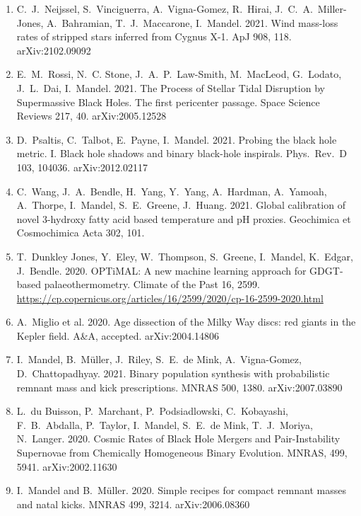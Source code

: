 \documentclass[margin,line]{res}
\begin{document}
\begin{resume}
\begin{enumerate}
\item C.~J.~Neijssel, S.~Vinciguerra, A.~Vigna-Gomez, R.~Hirai, J.~C.~A.~Miller-Jones, A.~Bahramian, T.~J.~Maccarone, I.~Mandel.  2021.  Wind mass-loss rates of stripped stars inferred from Cygnus X-1. ApJ 908, 118.  arXiv:2102.09092

\item E.~M.~Rossi, N.~C. Stone, J.~A.~P.~Law-Smith, M.~MacLeod, G.~Lodato, J.~L.~Dai, I.~Mandel.  2021.  The Process of Stellar Tidal Disruption by Supermassive Black Holes. The first pericenter passage.  Space Science Reviews 217, 40.  arXiv:2005.12528

\item D.~Psaltis, C.~Talbot, E.~Payne, I.~Mandel.  2021. Probing the black hole metric. I. Black hole shadows and binary black-hole inspirals.  Phys.~Rev.~D 103, 104036. arXiv:2012.02117

\item C.~Wang, J.~A.~Bendle,  H.~Yang, Y.~Yang, A.~Hardman, A.~Yamoah, A.~Thorpe, I.~Mandel, S.~E.~Greene, J.~Huang.  2021. Global calibration of novel 3-hydroxy fatty acid based temperature and pH proxies.  Geochimica et Cosmochimica Acta 302, 101. 

\item T.~Dunkley Jones, Y.~Eley, W.~Thompson, S.~Greene, I.~Mandel, K.~Edgar, J.~Bendle.  2020.  OPTiMAL: A new machine learning approach for GDGT-based palaeothermometry.  Climate of the Past 16, 2599.  \url{https://cp.copernicus.org/articles/16/2599/2020/cp-16-2599-2020.html}

\item A.~Miglio et al. 2020. Age dissection of the Milky Way discs: red giants in the Kepler field.  A\&A, accepted.  arXiv:2004.14806

\item I.~Mandel, B.~M\"{u}ller, J.~Riley, S.~E.~de Mink, A.~Vigna-Gomez, D.~Chattopadhyay. 2021.  Binary population synthesis with probabilistic remnant mass and kick prescriptions. MNRAS 500, 1380.   arXiv:2007.03890

\item L.~du Buisson, P.~Marchant, P.~Podsiadlowski, C.~Kobayashi, F.~B.~Abdalla, P.~Taylor, I.~Mandel, S.~E.~de Mink, T.~J.~Moriya, N.~Langer.  2020. Cosmic Rates of Black Hole Mergers and Pair-Instability Supernovae from Chemically Homogeneous Binary Evolution. MNRAS, 499, 5941.  arXiv:2002.11630

\item I.~Mandel and B.~M\"{u}ller. 2020. Simple recipes for compact remnant masses and natal kicks.  MNRAS 499, 3214.  arXiv:2006.08360


\end{enumerate}
\end{resume}
\end{document}
